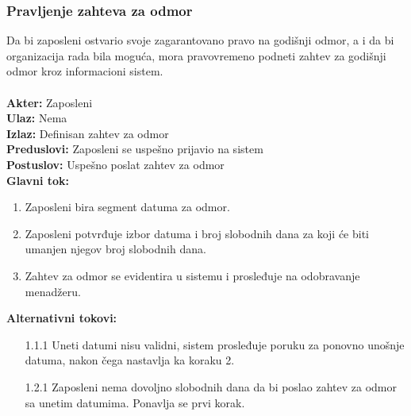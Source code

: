 \documentclass{article}
\begin{document}
\subsubsection{Pravljenje zahteva za odmor}
Da bi zaposleni ostvario svoje zagarantovano pravo na godišnji odmor, a i da bi organizacija rada bila moguća, mora pravovremeno podneti zahtev za godišnji odmor kroz informacioni sistem.\\\\
\textbf{Akter:} Zaposleni\\
\textbf{Ulaz:} Nema\\
\textbf{Izlaz:} Definisan zahtev za odmor\\
\textbf{Preduslovi:} Zaposleni se uspešno prijavio na sistem\\
\textbf{Postuslov:} Uspešno poslat zahtev za odmor\\
\textbf{Glavni tok:}
\begin{enumerate}
\item Zaposleni bira segment datuma za odmor.
\item Zaposleni potvrđuje izbor datuma i broj slobodnih dana za koji će biti umanjen njegov broj slobodnih dana.
\item Zahtev za odmor se evidentira u sistemu i prosleđuje na odobravanje menadžeru.
\end{enumerate}
\textbf{Alternativni tokovi:} \\
\begin{itemize}
\item [1.1.1] Uneti datumi nisu validni, sistem prosleđuje poruku za ponovno unošnje datuma, nakon čega nastavlja ka koraku 2.
\item [1.2.1] Zaposleni nema dovoljno slobodnih dana da bi poslao zahtev za odmor sa unetim datumima. Ponavlja se prvi korak.
\end{itemize}
\end{document}
